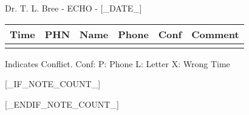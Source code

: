 \documentclass[12pt]{article}
\newenvironment{my_enumerate}{
\begin{enumerate}
  \setlength{\itemsep}{1pt}
  \setlength{\parskip}{0pt}
  \setlength{\parsep}{0pt}}{\end{enumerate}
}
\begin{document}
\begin{center}
{\Large Dr. T. L. Bree - ECHO - [_DATE_]} \\[.5pc]
\end{center}


\footnotesize
\vspace{0.12in}

\begin{center}
\begin{tabular}{rllrll}
\textbf{Time} & \textbf{PHN} & \textbf{Name} & \textbf{Phone} & \textbf{Conf} & \textbf{Comment} \\
\midrule
[_CONTENTS_]
\bottomrule
\vspace{-0.40in}
\end{tabular}
\end{center}

\begin{center}
{\scriptsize * Indicates Conflict.  Conf: P: Phone L: Letter X: Wrong Time}
\end{center}


[_IF_NOTE_COUNT_]
\begin{my_enumerate}
[_NOTES_]
\end{my_enumerate}
[_ENDIF_NOTE_COUNT_]
\end{document}
